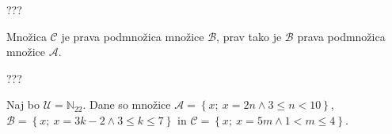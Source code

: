 \documentclass[addpoints,12pt]{exam}
\begin{document}
\begin{questions}


    \begin{solution}[9cm]
???
    \end{solution}

\newpage
    \question
    Množica $\mathcal{C}$ je prava podmnožica množice $\mathcal{B}$, prav tako je $\mathcal{B}$ prava podmnožica množice $\mathcal{A}$.

    \begin{solution}[1cm]
???
    \end{solution}




    \newpage

    \question
    Naj bo $\mathcal{U}=\mathbb{N}_{22}$. Dane so množice $\mathcal{A}=\left\{x;\ x=2n \land 3\leq n<10\right\}$, \\ $\mathcal{B}=\left\{x;\ x=3k-2 \land 3\leq k\leq 7\right\}$ in $\mathcal{C}=\left\{x;\ x=5m \land 1<m\leq 4\right\}$. 
    \begin{parts}

\end{parts}
\end{questions}
\end{document}
